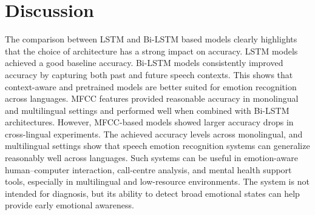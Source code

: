 \documentclass[runningheads]{llncs}
\begin{document}
\section{Discussion}
The comparison between LSTM and Bi-LSTM based models clearly highlights that the choice of architecture has a strong impact on accuracy. LSTM models achieved a good baseline accuracy. Bi-LSTM models consistently improved accuracy by capturing both past and future speech contexts. This shows that context-aware and pretrained models are better suited for emotion recognition across languages. MFCC features provided reasonable accuracy in monolingual and multilingual settings and performed well when combined with Bi-LSTM architectures. However, MFCC-based models showed larger accuracy drops in cross-lingual experiments. The achieved accuracy levels across monolingual, and multilingual settings show that speech emotion recognition systems can generalize reasonably well across languages. Such systems can be useful in emotion-aware human–computer interaction, call-centre analysis, and mental health support tools, especially in multilingual and low-resource environments. The system is not intended for diagnosis, but its ability to detect broad emotional states can help provide early emotional awareness.



\end{document}
